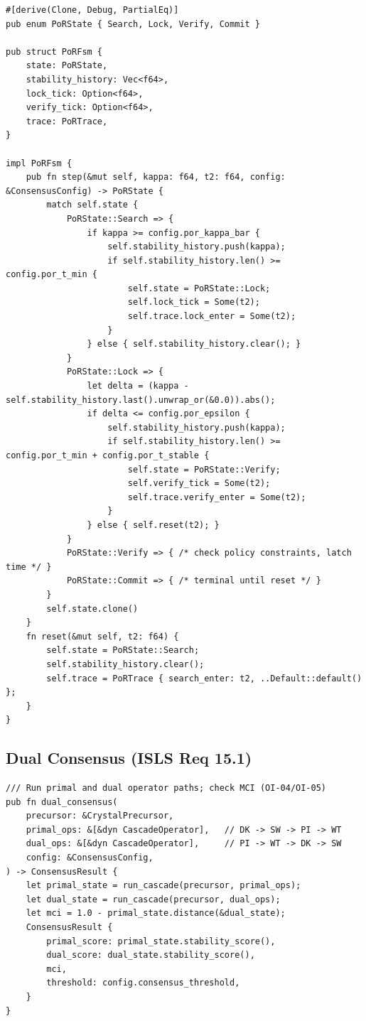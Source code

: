 \documentclass[10pt,a4paper]{article}
\theoremstyle{definition}\newtheorem{definition}{Def}[section]
\theoremstyle{plain}\newtheorem{theorem}{Thm}[section]
\begin{document}
\begin{lstlisting}[style=rust]
#[derive(Clone, Debug, PartialEq)]
pub enum PoRState { Search, Lock, Verify, Commit }

pub struct PoRFsm {
    state: PoRState,
    stability_history: Vec<f64>,
    lock_tick: Option<f64>,
    verify_tick: Option<f64>,
    trace: PoRTrace,
}

impl PoRFsm {
    pub fn step(&mut self, kappa: f64, t2: f64, config: &ConsensusConfig) -> PoRState {
        match self.state {
            PoRState::Search => {
                if kappa >= config.por_kappa_bar {
                    self.stability_history.push(kappa);
                    if self.stability_history.len() >= config.por_t_min {
                        self.state = PoRState::Lock;
                        self.lock_tick = Some(t2);
                        self.trace.lock_enter = Some(t2);
                    }
                } else { self.stability_history.clear(); }
            }
            PoRState::Lock => {
                let delta = (kappa - self.stability_history.last().unwrap_or(&0.0)).abs();
                if delta <= config.por_epsilon {
                    self.stability_history.push(kappa);
                    if self.stability_history.len() >= config.por_t_min + config.por_t_stable {
                        self.state = PoRState::Verify;
                        self.verify_tick = Some(t2);
                        self.trace.verify_enter = Some(t2);
                    }
                } else { self.reset(t2); }
            }
            PoRState::Verify => { /* check policy constraints, latch time */ }
            PoRState::Commit => { /* terminal until reset */ }
        }
        self.state.clone()
    }
    fn reset(&mut self, t2: f64) {
        self.state = PoRState::Search;
        self.stability_history.clear();
        self.trace = PoRTrace { search_enter: t2, ..Default::default() };
    }
}
\end{lstlisting}

\subsection{Dual Consensus (ISLS Req 15.1)}

\begin{lstlisting}[style=rust]
/// Run primal and dual operator paths; check MCI (OI-04/OI-05)
pub fn dual_consensus(
    precursor: &CrystalPrecursor,
    primal_ops: &[&dyn CascadeOperator],   // DK -> SW -> PI -> WT
    dual_ops: &[&dyn CascadeOperator],     // PI -> WT -> DK -> SW
    config: &ConsensusConfig,
) -> ConsensusResult {
    let primal_state = run_cascade(precursor, primal_ops);
    let dual_state = run_cascade(precursor, dual_ops);
    let mci = 1.0 - primal_state.distance(&dual_state);
    ConsensusResult {
        primal_score: primal_state.stability_score(),
        dual_score: dual_state.stability_score(),
        mci,
        threshold: config.consensus_threshold,
    }
}
\end{lstlisting}
\end{document}
